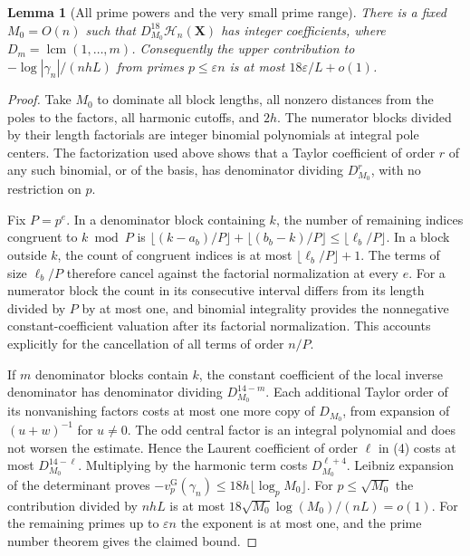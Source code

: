\IfFileExists{TS1cmr.fd}{\documentclass[11pt]{article}}
\newtheorem{lemma}[theorem]{Lemma}
\DeclareMathOperator{\lcm}{lcm}
\newcommand{\vg}{v_p^{\mathrm G}}
\begin{document}
\begin{lemma}[All prime powers and the very small prime range]
There is a fixed \(M_0=O(n)\) such that
\(D_{M_0}^{18}\mathcal H_n(\mathbf X)\) has integer coefficients,
where \(D_m=\lcm(1,\ldots,m)\). Consequently the upper
contribution to \(-\log|\gamma_n|/(nhL)\) from primes
\(p\le\varepsilon n\) is at most \(18\varepsilon/L+o(1)\).
\end{lemma}
\begin{proof}
Take \(M_0\) to dominate all block lengths, all nonzero distances
from the poles to the factors, all harmonic cutoffs, and \(2h\).
The numerator blocks divided by their length factorials are
integer binomial polynomials at integral pole centers. The
factorization used above shows that a Taylor coefficient of
order \(r\) of any such binomial, or of the basis, has denominator
dividing \(D_{M_0}^r\), with no restriction on \(p\).

Fix \(P=p^e\). In a denominator block containing \(k\), the
number of remaining indices congruent to \(k\bmod P\) is
\(\lfloor(k-a_b)/P\rfloor+\lfloor(b_b-k)/P\rfloor\le
\lfloor\ell_b/P\rfloor\). In a block outside \(k\), the count of
congruent indices is at most \(\lfloor\ell_b/P\rfloor+1\).
The terms of size \(\ell_b/P\) therefore cancel against the
factorial normalization at every \(e\). For a numerator block
the count in its consecutive interval differs from its length
divided by \(P\) by at most one, and binomial integrality
provides the nonnegative constant-coefficient valuation after
its factorial normalization. This accounts explicitly for the
cancellation of all terms of order \(n/P\).

If \(m\) denominator blocks contain \(k\), the constant
coefficient of the local inverse denominator has denominator
dividing \(D_{M_0}^{14-m}\). Each additional Taylor order of
its nonvanishing factors costs at most one more copy of
\(D_{M_0}\), from expansion of \((u+w)^{-1}\) for \(u\ne 0\).
The odd central factor is an integral polynomial and does not
worsen the estimate. Hence the Laurent coefficient of order
\(\ell\) in (4) costs at most \(D_{M_0}^{14-\ell}\).
Multiplying by the harmonic term costs \(D_{M_0}^{\ell+4}\).
Leibniz expansion of the determinant proves
\(-\vg(\gamma_n)\le 18h\lfloor\log_p M_0\rfloor\).
For \(p\le\sqrt{M_0}\) the contribution divided by \(nhL\) is
at most \(18\sqrt{M_0}\log(M_0)/(nL)=o(1)\). For the remaining
primes up to \(\varepsilon n\) the exponent is at most one,
and the prime number theorem gives the claimed bound.
\end{proof}
\end{document}

